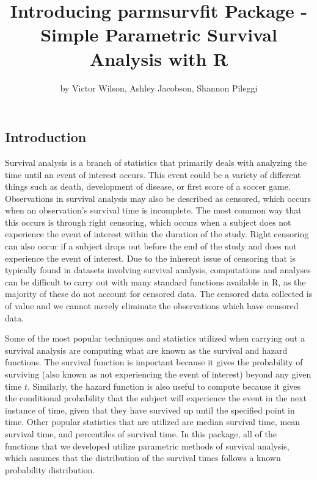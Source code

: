 \title{Introducing parmsurvfit Package - Simple Parametric Survival Analysis
with R}
\author{by Victor Wilson, Ashley Jacobson, Shannon Pileggi}

\maketitle



\hypertarget{introduction}{%
\subsection{Introduction}\label{introduction}}

Survival analysis is a branch of statistics that primarily deals with
analyzing the time until an event of interest occurs. This event could
be a variety of different things such as death, development of disease,
or first score of a soccer game. Observations in survival analysis may
also be described as censored, which occurs when an observation's
survival time is incomplete. The most common way that this occurs is
through right censoring, which occurs when a subject does not experience
the event of interest within the duration of the study. Right censoring
can also occur if a subject drops out before the end of the study and
does not experience the event of interest. Due to the inherent issue of
censoring that is typically found in datasets involving survival
analysis, computations and analyses can be difficult to carry out with
many standard functions available in R, as the majority of these do not
account for censored data. The censored data collected is of value and
we cannot merely eliminate the observations which have censored data.

Some of the most popular techniques and statistics utilized when
carrying out a survival analysis are computing what are known as the
survival and hazard functions. The survival function is important
because it gives the probability of surviving (also known as not
experiencing the event of interest) beyond any given time \(t\).
Similarly, the hazard function is also useful to compute because it
gives the conditional probability that the subject will experience the
event in the next instance of time, given that they have survived up
until the specified point in time. Other popular statistics that are
utilized are median survival time, mean survival time, and percentiles
of survival time. In this package, all of the functions that we
developed utilize parametric methods of survival analysis, which assumes
that the distribution of the survival times follows a known probability
distribution.

